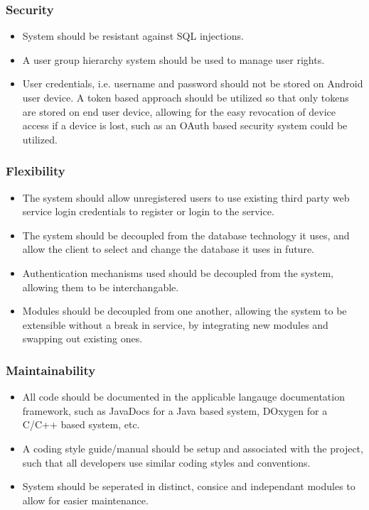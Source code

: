 \documentclass[a4paper,10pt]{article}
\begin{document}
\subsubsection{Security}
\begin{itemize}
\item System should be resistant against SQL injections.
\item A user group hierarchy system should be used to manage user rights.
\item User credentials, i.e. username and password should not be stored on Android user device. A token based approach should be utilized so that only tokens are stored on end user device, allowing for the easy revocation of device access if a device is lost, such as an OAuth based security system could be utilized.
\end{itemize}

\subsubsection{Flexibility}
\begin{itemize}
\item The system should allow unregistered users to use existing third party web service login credentials to register or login to the service.
\item The system should be decoupled from the database technology it uses, and allow the client to select and change the database it uses in future.
\item Authentication mechanisms used should be decoupled from the system, allowing them to be interchangable.
\item Modules should be decoupled from one another, allowing the system to be extensible without a break in service, by integrating new modules and swapping out existing ones. 
\end{itemize}

\subsubsection{Maintainability}
\begin{itemize}
\item All code should be documented in the applicable langauge documentation framework, such as JavaDocs for a Java based system, DOxygen for a C/C++ based system, etc.
\item A coding style guide/manual should be setup and associated with the project, such that all developers use similar coding styles and conventions.
\item System should be seperated in distinct, consice and independant modules to allow for easier maintenance.
\end{itemize}
\end{document}
